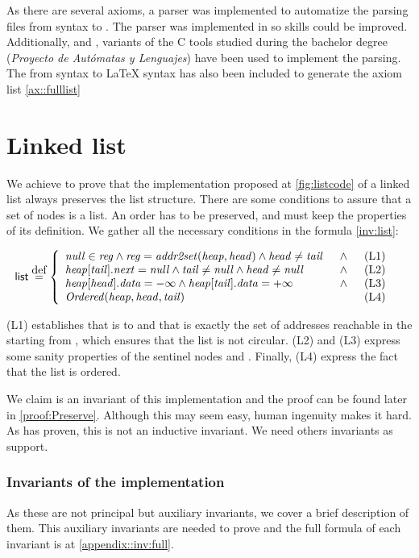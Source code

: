 As there are several axioms, a parser was implemented to automatize the parsing files from \spass syntax to \leap. 
%
The parser was implemented in \ocaml so \ocaml skills could be improved. Additionally,  and , \ocaml variants of the \mbox{C} tools studied during the bachelor degree (\textit{Proyecto de Autómatas y Lenguajes}) have been used to implement the parsing.
%
The  from \spass syntax to \LaTeX\; syntax has also been included to generate the axiom list \ref{ax::fulllist}



\section{Linked list}
%
We achieve to prove that the implementation proposed at \ref{fig:listcode} of a linked list always preserves the list structure. 
%
There are some conditions to assure that a set of nodes is a list.
%
An order has to be preserved, \head and \tail must keep the properties of its definition. 
%
We gather all the necessary conditions in the formula \ref{inv:list}:


	\begin{align}
	  	\invPreserve & \overset{\mbox{def}}{=} \formulaFullListReducedBody
	  	\label{inv:list}
	\end{align}

(L1) establishes that \fNull is to \region and that \region is
exactly the set of addresses reachable in the \heap starting from
\head, which ensures that the list is not circular.
%
(L2) and (L3) express some sanity properties of the sentinel nodes
\head and \tail.
%
Finally, (L4) express the fact that the list is ordered.

We claim \invPreserve is an invariant of this implementation and the proof can be found later in \ref{proof:Preserve}. 
%
Although this may seem easy, human ingenuity makes it hard. 
%
As  has proven, this is not an inductive invariant. 
%
We need others invariants as support.

\subsubsection{Invariants of the implementation}
\label{invariants}
As these are not principal but auxiliary invariants, we cover a brief description of them.
%
This auxiliary invariants are needed to prove \invPreserve and 
%
the full formula of each invariant is at \ref{appendix::inv:full}.
%
%
%
%
